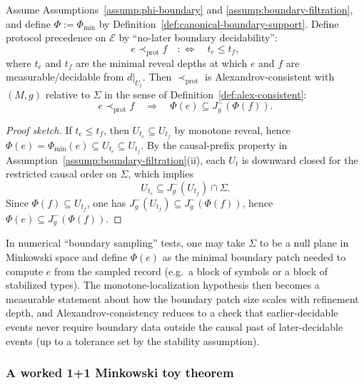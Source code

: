 \begin{proposition}\label{prop:boundary-filtration-implies-alex}
Assume Assumptions~\ref{assump:phi-boundary} and \ref{assump:boundary-filtration}, and define \(\Phi:=\Phi_{\min}\) by Definition~\ref{def:canonical-boundary-support}.
Define protocol precedence on \(\mathcal{E}\) by ``no-later boundary decidability'':
\[
e\prec_{\mathrm{prot}} f
\quad:\Longleftrightarrow\quad
t_e\le t_f,
\]
where \(t_e\) and \(t_f\) are the minimal reveal depths at which \(e\) and \(f\) are measurable/decidable from \(d|_{U_t}\).
Then \(\prec_{\mathrm{prot}}\) is Alexandrov-consistent with \((M,g)\) relative to \(\Sigma\) in the sense of Definition~\ref{def:alex-consistent}:
\[
e\prec_{\mathrm{prot}} f \quad\Rightarrow\quad \Phi(e)\subseteq J^-_g(\Phi(f)).
\]
\end{proposition}

\begin{proof}[Proof sketch]
If \(t_e\le t_f\), then \(U_{t_e}\subseteq U_{t_f}\) by monotone reveal, hence \(\Phi(e)=\Phi_{\min}(e)\subseteq U_{t_e}\subseteq U_{t_f}\).
By the causal-prefix property in Assumption~\ref{assump:boundary-filtration}(ii), each \(U_t\) is downward closed for the restricted causal order on \(\Sigma\), which implies
\[
U_{t_e}\subseteq J^-_g(U_{t_f})\cap \Sigma.
\]
Since \(\Phi(f)\subseteq U_{t_f}\), one has \(J^-_g(U_{t_f})\subseteq J^-_g(\Phi(f))\), hence \(\Phi(e)\subseteq J^-_g(\Phi(f))\).
\end{proof}

\begin{remark}\label{rem:toy-check}
In numerical ``boundary sampling'' tests, one may take $\Sigma$ to be a null plane in Minkowski space and define $\Phi(e)$ as the minimal boundary patch needed to compute $e$ from the sampled record (e.g.\ a block of symbols or a block of stabilized types). The monotone-localization hypothesis then becomes a measurable statement about how the boundary patch size scales with refinement depth, and Alexandrov-consistency reduces to a check that earlier-decidable events never require boundary data outside the causal past of later-decidable events (up to a tolerance set by the stability assumption).
\end{remark}

\subsubsection{A worked 1+1 Minkowski toy theorem}\label{sec:causality:toy-minkowski}

